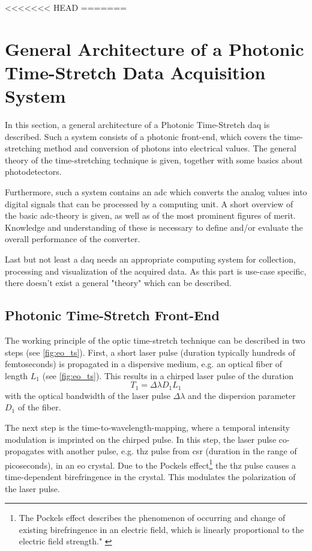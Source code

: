 <<<<<<< HEAD
=======
\section{General Architecture of a Photonic Time-Stretch Data Acquisition System}
In this section, a general architecture of a Photonic Time-Stretch \gls{daq} is described. Such a system consists of a photonic front-end, which covers the time-stretching method and conversion of photons into electrical values. The general theory of the time-stretching technique is given, together with some basics about photodetectors. 

Furthermore, such a system contains an \gls{adc} which converts the analog values into digital signals that can be processed by a computing unit. A short overview of the basic \gls{adc}-theory is given, as well as of the most prominent figures of merit. Knowledge and understanding of these is necessary to define and/or evaluate the overall performance of the converter. 

Last but not least a \gls{daq} needs an appropriate computing system for collection, processing and visualization of the acquired data. As this part is use-case specific, there doesn't exist a general "theory" which can be described.

\subsection{Photonic Time-Stretch Front-End}
The working principle of the optic time-stretch technique can be described in two steps (see \autoref{fig:eo_ts}).
First, a short laser pulse (duration typically hundreds of femtoseconds) is propagated in a dispersive medium, e.g. an optical fiber of length $L_1$ (see \autoref{fig:eo_ts}). 
This results in a chirped laser pulse of the duration
\begin{equation}
	T_1 = \Delta \lambda D_1 L_1
\end{equation}
with the optical bandwidth of the laser pulse $\Delta \lambda$  and the dispersion parameter $D_1$ of the fiber.

The next step is the time-to-wavelength-mapping, where a temporal intensity modulation is imprinted on the chirped pulse. In this step, the laser pulse co-propagates with another pulse, e.g. \gls{thz} pulse from \gls{csr} (duration in the range of picoseconds), in an \gls{eo} crystal. Due to the Pockels effect\footnote{The Pockels effect describes the phenomenon of occurring and change of existing birefringence in an electric field, which is linearly proportional to the electric field strength." \cite{pockels}} the \gls{thz} pulse causes a time-dependent birefringence in the crystal.
This modulates the polarization of the laser pulse.

